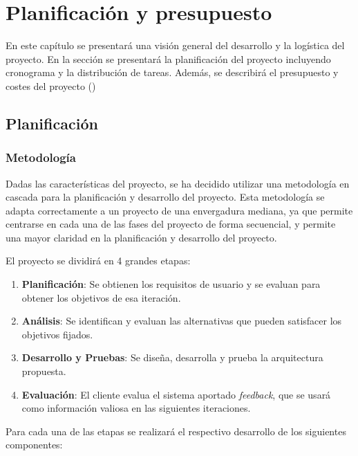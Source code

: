 \chapter{Planificación y presupuesto}\label{chap:planificacion}

En este capítulo se presentará una visión general del desarrollo y la logística del proyecto. En la sección  se presentará la planificación del proyecto incluyendo cronograma y la distribución de tareas. Además, se describirá el presupuesto y costes del proyecto () 

\section{Planificación}\label{sec:planificacion}

\subsection{Metodología}\label{sec:metodologia}

Dadas las características del proyecto, se ha decidido utilizar una metodología en cascada \cite{ModeloCascada} para la planificación y desarrollo del proyecto. Esta metodología se adapta correctamente a un proyecto de una envergadura mediana, ya que permite centrarse en cada una de las fases del proyecto de forma secuencial, y permite una mayor claridad en la planificación y desarrollo del proyecto.

El proyecto se dividirá en 4 grandes etapas: 

\begin{enumerate}
    \item \textbf{Planificación}: Se obtienen los requisitos de usuario y se evaluan para obtener los objetivos de esa iteración.
    \item \textbf{Análisis}: Se identifican y evaluan las alternativas que pueden satisfacer los objetivos fijados.
    \item \textbf{Desarrollo y Pruebas}: Se diseña, desarrolla y prueba la arquitectura propuesta.
    \item \textbf{Evaluación}: El cliente evalua el sistema aportado \textit{feedback}, que se usará como información valiosa en las siguientes iteraciones.
\end{enumerate}

Para cada una de las etapas se realizará el respectivo desarrollo de los siguientes componentes:

